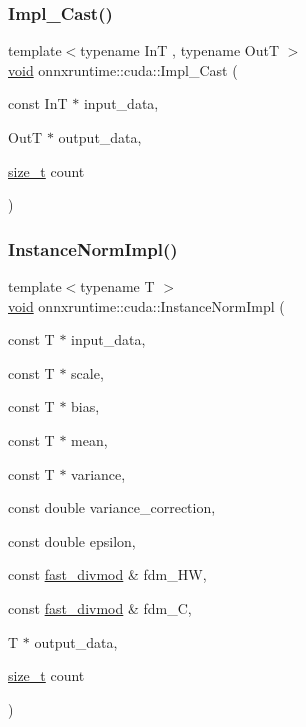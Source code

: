 \mbox{\label{namespaceonnxruntime_1_1cuda_a5ec73c46b242d6ea59dd9965bc34e13f}} 
\subsubsection{\texorpdfstring{Impl\+\_\+\+Cast()}{Impl\_Cast()}}
{\footnotesize\ttfamily template$<$typename InT , typename OutT $>$ \\
\mbox{\hyperlink{mlasi_8h_a88f941d423cb2a819b70a1358982b1a6}{void}} onnxruntime\+::cuda\+::\+Impl\+\_\+\+Cast (\begin{DoxyParamCaption}\item[{const InT $\ast$}]{input\+\_\+data,  }\item[{OutT $\ast$}]{output\+\_\+data,  }\item[{\mbox{\hyperlink{mlasi_8h_a503efbc1c6e50825320ad909366b78ab}{size\+\_\+t}}}]{count }\end{DoxyParamCaption})}

\mbox{\label{namespaceonnxruntime_1_1cuda_af407fc77f1d77fc8f5a4a421d8545fbd}} 
\subsubsection{\texorpdfstring{Instance\+Norm\+Impl()}{InstanceNormImpl()}}
{\footnotesize\ttfamily template$<$typename T $>$ \\
\mbox{\hyperlink{mlasi_8h_a88f941d423cb2a819b70a1358982b1a6}{void}} onnxruntime\+::cuda\+::\+Instance\+Norm\+Impl (\begin{DoxyParamCaption}\item[{const T $\ast$}]{input\+\_\+data,  }\item[{const T $\ast$}]{scale,  }\item[{const T $\ast$}]{bias,  }\item[{const T $\ast$}]{mean,  }\item[{const T $\ast$}]{variance,  }\item[{const double}]{variance\+\_\+correction,  }\item[{const double}]{epsilon,  }\item[{const \mbox{\hyperlink{classonnxruntime_1_1cuda_1_1fast__divmod}{fast\+\_\+divmod}} \&}]{fdm\+\_\+\+HW,  }\item[{const \mbox{\hyperlink{classonnxruntime_1_1cuda_1_1fast__divmod}{fast\+\_\+divmod}} \&}]{fdm\+\_\+C,  }\item[{T $\ast$}]{output\+\_\+data,  }\item[{\mbox{\hyperlink{mlasi_8h_a503efbc1c6e50825320ad909366b78ab}{size\+\_\+t}}}]{count }\end{DoxyParamCaption})}

